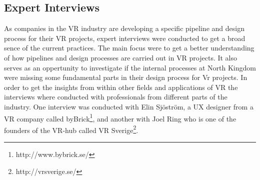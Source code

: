 \subsection{Expert Interviews}
As companies in the VR industry are developing a specific pipeline and design process for their VR projects, expert interviews were conducted to get a broad sence of the current practices. The main focus were to get a better understanding of how pipelines and design processes are carried out in VR projects. It also serves as an oppertunity to investigate if the internal processes at North Kingdom were missing some fundamental parts in their design process for Vr projects. In order to get the insights from within other fields and applications of VR the interviews where conducted with professionals from different parts of the industry. One interview was conducted with Elin Sj\"ostr\"om, a UX designer from a VR company called byBrick\footnote{http://www.bybrick.se/}, and another with Joel Ring who is one of the founders of the VR-hub called VR Sverige\footnote{http://vrsverige.se/}.

